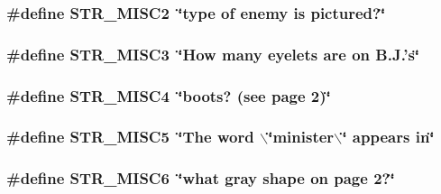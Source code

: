 \label{F__SPEAR_8H_aa662dd23314b8fb854b40b2b23c67b2c}
\hypertarget{F__SPEAR_8H_a4fddac0a654c22da0cdacc25f0d34027}{
\subsubsection[{STR\_\-MISC2}]{\setlength{\rightskip}{0pt plus 5cm}\#define STR\_\-MISC2~\char`\"{}type of enemy is pictured?\char`\"{}}}
\label{F__SPEAR_8H_a4fddac0a654c22da0cdacc25f0d34027}
\hypertarget{F__SPEAR_8H_a22b349dcf704eb20029419338278215e}{
\subsubsection[{STR\_\-MISC3}]{\setlength{\rightskip}{0pt plus 5cm}\#define STR\_\-MISC3~\char`\"{}How many eyelets are on B.J.'s\char`\"{}}}
\label{F__SPEAR_8H_a22b349dcf704eb20029419338278215e}
\hypertarget{F__SPEAR_8H_ac7a6a6a0159f2e51607388241d33dbb4}{
\subsubsection[{STR\_\-MISC4}]{\setlength{\rightskip}{0pt plus 5cm}\#define STR\_\-MISC4~\char`\"{}boots? (see page 2)\char`\"{}}}
\label{F__SPEAR_8H_ac7a6a6a0159f2e51607388241d33dbb4}
\hypertarget{F__SPEAR_8H_a7a88e83ae39ebc60b917249d816a4485}{
\subsubsection[{STR\_\-MISC5}]{\setlength{\rightskip}{0pt plus 5cm}\#define STR\_\-MISC5~\char`\"{}The {\bf word} $\backslash$\char`\"{}minister$\backslash$\char`\"{} appears in\char`\"{}}}
\label{F__SPEAR_8H_a7a88e83ae39ebc60b917249d816a4485}
\hypertarget{F__SPEAR_8H_af83844b6869c692c98993da5523494c4}{
\subsubsection[{STR\_\-MISC6}]{\setlength{\rightskip}{0pt plus 5cm}\#define STR\_\-MISC6~\char`\"{}what gray shape on page 2?\char`\"{}}}
